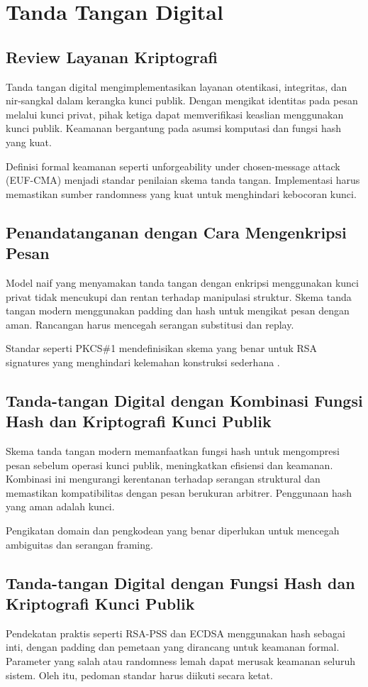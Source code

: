 \documentclass[../main.tex]{subfiles}
\begin{document}
\chapter{Tanda Tangan Digital}

\section{Review Layanan Kriptografi}
Tanda tangan digital mengimplementasikan layanan otentikasi, integritas, dan nir-sangkal dalam kerangka kunci publik. Dengan mengikat identitas pada pesan melalui kunci privat, pihak ketiga dapat memverifikasi keaslian menggunakan kunci publik. Keamanan bergantung pada asumsi komputasi dan fungsi hash yang kuat.

Definisi formal keamanan seperti unforgeability under chosen-message attack (EUF-CMA) menjadi standar penilaian skema tanda tangan. Implementasi harus memastikan sumber randomness yang kuat untuk menghindari kebocoran kunci.

\section{Penandatanganan dengan Cara Mengenkripsi Pesan}
Model naif yang menyamakan tanda tangan dengan enkripsi menggunakan kunci privat tidak mencukupi dan rentan terhadap manipulasi struktur. Skema tanda tangan modern menggunakan padding dan hash untuk mengikat pesan dengan aman. Rancangan harus mencegah serangan substitusi dan replay.

Standar seperti PKCS\#1 mendefinisikan skema yang benar untuk RSA signatures yang menghindari kelemahan konstruksi sederhana \parencite{rfc8017}.

\section{Tanda-tangan Digital dengan Kombinasi Fungsi Hash dan Kriptografi Kunci Publik}
Skema tanda tangan modern memanfaatkan fungsi hash untuk mengompresi pesan sebelum operasi kunci publik, meningkatkan efisiensi dan keamanan. Kombinasi ini mengurangi kerentanan terhadap serangan struktural dan memastikan kompatibilitas dengan pesan berukuran arbitrer. Penggunaan hash yang aman adalah kunci.

Pengikatan domain dan pengkodean yang benar diperlukan untuk mencegah ambiguitas dan serangan framing.

\section{Tanda-tangan Digital dengan Fungsi Hash dan Kriptografi Kunci Publik}
Pendekatan praktis seperti RSA-PSS dan ECDSA menggunakan hash sebagai inti, dengan padding dan pemetaan yang dirancang untuk keamanan formal. Parameter yang salah atau randomness lemah dapat merusak keamanan seluruh sistem. Oleh itu, pedoman standar harus diikuti secara ketat.
\end{document}
